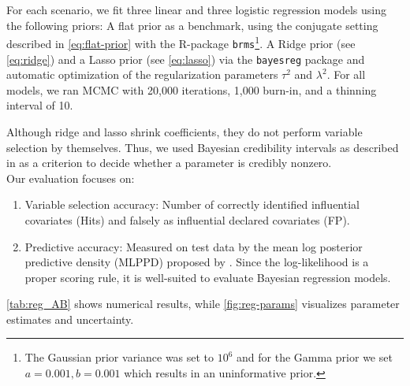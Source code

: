 For each scenario, we fit three linear and three logistic regression models using the following priors: A flat prior as a benchmark, using the conjugate setting described in \autoref{eq:flat-prior} with the R-package \texttt{brms}\footnote{The Gaussian prior variance was set to $10^6$ and for the Gamma prior we set $a = 0.001, b=0.001$ which results in an uninformative prior.}.
A Ridge prior (see \autoref{eq:ridge}) and a Lasso prior (see \autoref{eq:lasso}) via the \texttt{bayesreg} package and automatic optimization of the regularization parameters $\tau^2$ and $\lambda^2$.
For all models, we ran MCMC with 20,000 iterations, 1,000 burn-in, and a thinning interval of 10.

Although ridge and lasso shrink coefficients, they do not perform variable selection by themselves. Thus, we used Bayesian credibility intervals as described in \citet{van_erp_shrinkage_2019} as a criterion to decide whether a parameter is credibly nonzero.\\

Our evaluation focuses on:
\begin{enumerate}
    \item Variable selection accuracy: Number of correctly identified influential covariates (Hits) and falsely as influential declared covariates (FP).
    \item Predictive accuracy: Measured on test data by the mean log posterior predictive density (MLPPD) proposed by \citet{gelman_understanding_2013}. Since the log-likelihood is a proper scoring rule, it is well-suited to evaluate Bayesian regression models.
\end{enumerate}

\autoref{tab:reg_AB} shows numerical results, while \autoref{fig:reg-params} visualizes parameter estimates and uncertainty.


